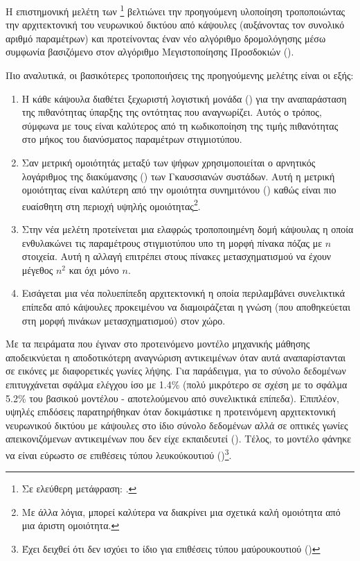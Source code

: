 Η επιστημονική μελέτη των \footnote{Σε ελεύθερη μετάφραση: .}\cite{hinton2018matrix} βελτιώνει την προηγούμενη υλοποίηση τροποποιώντας την αρχιτεκτονική του νευρωνικού δικτύου από κάψουλες (αυξάνοντας τον συνολικό αριθμό παραμέτρων) και προτείνοντας έναν νέο αλγόριθμο δρομολόγησης μέσω συμφωνία βασιζόμενο στον αλγόριθμο Μεγιστοποίησης Προσδοκιών (). \par

Πιο αναλυτικά, οι βασικότερες τροποποιήσεις της προηγούμενης μελέτης είναι οι εξής:
\begin{enumerate}
    \item Η κάθε κάψουλα διαθέτει ξεχωριστή λογιστική μονάδα () για την αναπαράσταση της πιθανότητας ύπαρξης της οντότητας που αναγνωρίζει. Αυτός ο τρόπος, σύμφωνα με τους \cite{hinton2018matrix} είναι καλύτερος από τη κωδικοποίηση της τιμής πιθανότητας στο μήκος του διανύσματος παραμέτρων στιγμιοτύπου.
    \item Σαν μετρική ομοιότητάς μεταξύ των ψήφων χρησιμοποιείται ο αρνητικός λογάριθμος της διακύμανσης () των Γκαυσσιανών συστάδων. Αυτή η μετρική ομοιότητας είναι καλύτερη από την ομοιότητα συνημιτόνου () καθώς είναι πιο ευαίσθητη στη περιοχή υψηλής ομοιότητας\footnote{Με άλλα λόγια, μπορεί καλύτερα να διακρίνει μια σχετικά καλή ομοιότητα από μια άριστη ομοιότητα.}.
    \item Στην νέα μελέτη προτείνεται μια ελαφρώς τροποποιημένη δομή κάψουλας η οποία ενθυλακώνει τις παραμέτρους στιγμιοτύπου υπο τη μορφή πίνακα πόζας με $n$ στοιχεία. Αυτή η αλλαγή επιτρέπει στους πίνακες μετασχηματισμού να έχουν μέγεθος $n^2$ και όχι μόνο $n$.
    \item Εισάγεται μια νέα πολυεπίπεδη αρχιτεκτονική η οποία περιλαμβάνει συνελικτικά επίπεδα από κάψουλες προκειμένου να διαμοιράζεται η γνώση (που αποθηκεύεται στη μορφή πινάκων μετασχηματισμού) στον χώρο.
\end{enumerate}\par

Με τα πειράματα που έγιναν στο προτεινόμενο μοντέλο μηχανικής μάθησης αποδεικνύεται η αποδοτικότερη αναγνώριση αντικειμένων όταν αυτά αναπαρίστανται σε εικόνες με διαφορετικές γωνίες λήψης. Για παράδειγμα, για το σύνολο δεδομένων  επιτυγχάνεται σφάλμα ελέγχου ίσο με 1.4\% (πολύ μικρότερο σε σχέση με το σφάλμα 5.2\% του βασικού μοντέλου - αποτελούμενου από συνελικτικά επίπεδα). Επιπλέον, υψηλές επιδόσεις παρατηρήθηκαν όταν δοκιμάστικε η προτεινόμενη αρχιτεκτονική νευρωνικού δικτύου με κάψουλες στο ίδιο σύνολο δεδομένων αλλά σε οπτικές γωνίες απεικονιζόμενων αντικειμένων που δεν είχε εκπαιδευτεί (). Τέλος, το μοντέλο φάνηκε να είναι εύρωστο σε επιθέσεις τύπου λευκού\textendash κουτιού ()\cite{goodfellow2014explaining}\footnote{Έχει δειχθεί ότι δεν ισχύει το ίδιο για επιθέσεις τύπου μαύρου\textendash κουτιού ()}. 

